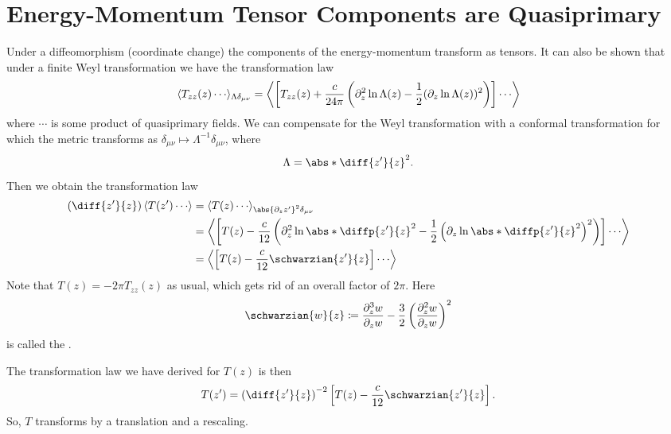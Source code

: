 \documentclass[fleqn]{NotesClass}
\DeclarePairedDelimiter{\correlator}{\langle}{\rangle}
\begin{document}
    \section{Energy-Momentum Tensor Components are Quasiprimary}
    Under a diffeomorphism (coordinate change) the components of the energy-momentum transform as tensors.
    It can also be shown that under a finite Weyl transformation we have the transformation law
    \begin{equation}
        \correlator{T_{zz}(z) \dotsm}_{\Lambda \delta_{\mu\nu}} = \correlator*{\left[ T_{zz}(z) + \frac{c}{24\pi}\left( \partial_z^2 \ln \Lambda(z) - \frac{1}{2}(\partial_z \ln \Lambda(z))^2 \right) \right] \dotsm}
    \end{equation}
    where \(\dotsm\) is some product of quasiprimary fields.
    We can compensate for the Weyl transformation with a conformal transformation for which the metric transforms as \(\delta_{\mu\nu} \mapsto \Lambda^{-1}\delta_{\mu\nu}\), where
    \begin{equation}
        \Lambda = \abs*{\diff{z'}{z}}^2.
    \end{equation}
    Then we obtain the transformation law
    \begin{align}
        \left( \diff{z'}{z} \right) \correlator{T(z') \dotsm} &= \correlator{T(z) \dotsm}_{\abs{\partial_zz'}^2\delta_{\mu\nu}}\\
        &= \correlator*{\left[ T(z) - \frac{c}{12}\left( \partial_z^2 \ln\abs*{\diffp{z'}{z}}^2 - \frac{1}{2}\left( \partial_z \ln \abs*{\diffp{z'}{z}}^2 \right)^2 \right) \right] \dotsm} \notag\\
        &= \correlator*{\left[ T(z) - \frac{c}{12} \schwarzian{z'}{z} \right] \dotsm}
    \end{align}
    Note that \(T(z) = -2\pi T_{zz}(z)\) as usual, which gets rid of an overall factor of \(2\pi\).
    Here 
    \begin{equation}
        \schwarzian{w}{z} \coloneqq \frac{\partial_z^3w}{\partial_zw} - \frac{3}{2}\left( \frac{\partial_z^2w}{\partial_zw} \right)^2
    \end{equation}
    is called the .
    
    The transformation law we have derived for \(T(z)\) is then
    \begin{equation}
        T(z') = \left( \diff{z'}{z} \right)^{-2} \left[ T(z) - \frac{c}{12}\schwarzian{z'}{z} \right].
    \end{equation}
    So, \(T\) transforms by a translation and a rescaling.
    
\end{document}
